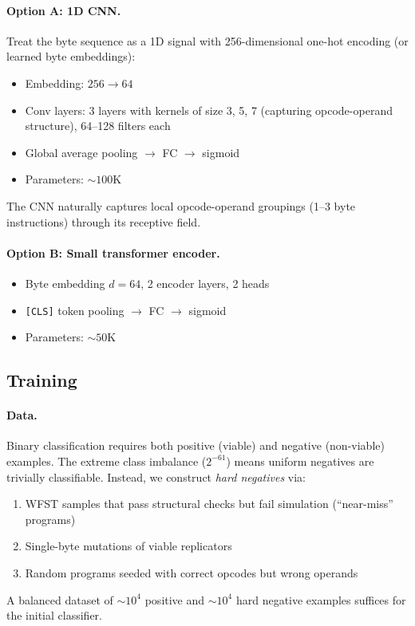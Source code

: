 \documentclass{article}
\begin{document}
\paragraph{Option A: 1D CNN.}
Treat the byte sequence as a 1D signal with 256-dimensional one-hot encoding
(or learned byte embeddings):
\begin{itemize}
  \item Embedding: $256 \to 64$
  \item Conv layers: 3 layers with kernels of size 3, 5, 7 (capturing
        opcode-operand structure), 64--128 filters each
  \item Global average pooling $\to$ FC $\to$ sigmoid
  \item Parameters: ${\sim}100$K
\end{itemize}
The CNN naturally captures local opcode-operand groupings (1--3 byte
instructions) through its receptive field.

\paragraph{Option B: Small transformer encoder.}
\begin{itemize}
  \item Byte embedding $d=64$, 2 encoder layers, 2 heads
  \item \texttt{[CLS]} token pooling $\to$ FC $\to$ sigmoid
  \item Parameters: ${\sim}50$K
\end{itemize}

\subsection{Training}

\paragraph{Data.}
Binary classification requires both positive (viable) and negative
(non-viable) examples.  The extreme class imbalance ($2^{-61}$) means
uniform negatives are trivially classifiable.  Instead, we construct
\emph{hard negatives} via:
\begin{enumerate}
  \item WFST samples that pass structural checks but fail simulation
        (``near-miss'' programs)
  \item Single-byte mutations of viable replicators
  \item Random programs seeded with correct opcodes but wrong operands
\end{enumerate}
A balanced dataset of ${\sim}10^4$ positive and ${\sim}10^4$ hard negative
examples suffices for the initial classifier.
\end{document}

